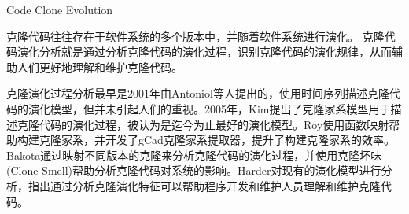 {Code Clone Evolution}
\label{ref-evolution}

克隆代码往往存在于软件系统的多个版本中，并随着软件系统进行演化。
克隆代码演化分析就是通过分析克隆代码的演化过程，识别克隆代码的演化规律，从而辅助人们更好地理解和维护克隆代码。

克隆演化过程分析最早是2001年由Antoniol等人提出的，使用时间序列描述克隆代码的演化模型\cite{antoniol2001modeling}，但并未引起人们的重视。2005年，Kim提出了克隆家系模型用于描述克隆代码的演化过程，被认为是迄今为止最好的演化模型\cite{kim2005empirical}。Roy使用函数映射帮助构建克隆家系，并开发了gCad克隆家系提取器，提升了构建克隆家系的效率\cite{saha2011automatic}。Bakota通过映射不同版本的克隆来分析克隆代码的演化过程，并使用克隆坏味(Clone Smell)帮助分析克隆代码对系统的影响\cite{bakota2011tracking}。Harder对现有的演化模型进行分析\cite{harder2009modeling}，指出通过分析克隆演化特征可以帮助程序开发和维护人员理解和维护克隆代码。



